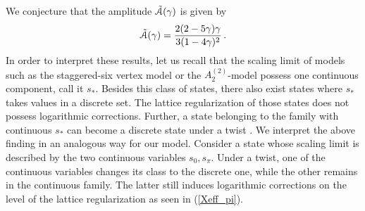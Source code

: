 \documentclass[12pt]{article}
\numberwithin{equation}{section}
\begin{document}
	We conjecture that the amplitude $\Tilde{\mathcal{A}}(\gamma)$ is given by 
	\begin{align}
		\Tilde{\mathcal{A}}(\gamma)=\frac{2 (2-5 \gamma ) \gamma }{3 (1-4 \gamma )^2}\,.
	\end{align}
	In order to interpret these results, let us recall that the scaling limit of models such as the staggered-six vertex model or the $A^{(2)}_2$-model possess one continuous component, call it $s_*$. Besides this class of states, there also exist states where $s_*$ takes values in a discrete set. The lattice regularization of those states does not possess logarithmic corrections. Further, a state belonging to the family with continuous $s_*$ can become a discrete state under a twist \cite{BKKL21a,VeJS14}. We interpret the above finding in an analogous way for our model. Consider a state whose scaling limit is described by the two continuous variables $s_0,s_\pi$. Under a twist, one of the continuous variables changes its class to the discrete one, while the other remains in the continuous family. The latter still induces logarithmic corrections on the level of the lattice regularization as seen in (\ref{Xeff_pi}). \\
\end{document}

